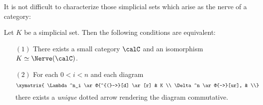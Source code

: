 It is not difficult to characterize those simplicial sets which arise as the nerve of a category:

\begin{proposition}\label{ruko}
Let $K$ be a simplicial set. Then the following conditions are equivalent:
\begin{itemize}
\item[$(1)$] There exists a small category $\calC$ and an isomorphism $K \simeq \Nerve(\calC)$.
\item[$(2)$] For each $0 < i < n$ and each diagram
$$ \xymatrix{ \Lambda^n_i \ar@{^{(}->}[d] \ar[r] & K \\
\Delta^n \ar@{-->}[ur], & \\}$$
there exists a {\em unique} dotted arrow rendering the diagram commutative.
\end{itemize}
\end{proposition}

